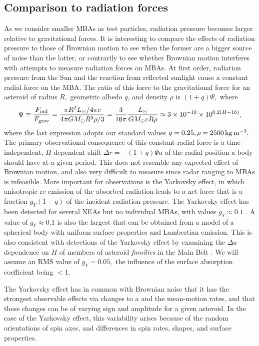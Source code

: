 \documentclass[linenumbers, onecolumn]{aastex631}
\newcommand{\eg}{\textit{e.g.\/}}
\newcommand\edited[1]{{\color{blue} {#1}}}
\begin{document}
\subsection{Comparison to radiation forces}
As we consider smaller MBAs as test particles, radiation pressure becomes larger relative to gravitational forces.  It is interesting to compare the effects of radiation pressure to those of Brownian motion to see when the former are a bigger source of noise than the latter, or contrarily to see whether Brownian motion interferes with attempts to measure radiation forces on MBAs.  At first order, radiation pressure from the Sun and the reaction from reflected sunlight cause a constant radial force on the MBA.  The ratio of this force to the gravitational force for an asteroid of radius $R,$ geometric albedo $q$, and density $\rho$ is $(1+q)\Psi,$ where
\begin{equation}
 \Psi \equiv \frac{F_{\rm rad}}{F_{\rm grav}} = \frac{\pi R^2 L_\odot/4\pi c}{4\pi GM_\odot R^3\rho/3}
   = \frac{3}{16\pi} \frac{L_\odot}{GM_\odot c R \rho} \approx
   3\times10^{-10} \times 10^{0.2(H-16)},
\end{equation}
where the last expression adopts our standard values $q=0.25,
\rho=2500\,{\rm kg}\, {\rm m}^{-3}.$ The primary observational consequence of
this constant radial force is a time-independent, $H$-dependent 
shift $\Delta r = -(1+q)\Psi a$ of the radial position a body should
have at a given period.  
This does not resemble
any expected effect of Brownian motion, and also very difficult to
measure since radar ranging to MBAs is infeasible.  More important for
observations is the
Yarkovsky effect, in which anisotropic re-emission of the absorbed
radiation leads to a net force that is a fraction $g_Y(1-q)$ of the
incident radiation pressure.  The Yarkovsky effect has been detected
for several NEAs but no individual MBAs, with values $g_Y \approx 0.1$
\citep[Yarkovsky effect and data are review by][]{yarkovsky}.
\edited{A value of $g_Y\approx0.1$ is also the largest that can be obtained
  from a model of a spherical body with uniform surface properties and
  Lambertian emission.} This is also consistent with detections of the
Yarkovsky effect by examining the $\Delta a$ dependence on $H$ of
members of asteroid \emph{families} in the Main Belt
\citep[\eg][]{karin}.  \edited{We will assume an RMS value of $g_Y=0.05,$
the influence of the surface absorption coefficient being $<1.$}

 The Yarkovsky effect has in common with Brownian noise that it has the strongest observable effects via changes to $a$ and the mean-motion rates, and that these changes can be of varying sign and amplitude for a given asteroid.  In the case of the Yarkovsky effect, this variability arises because of the random orientations of spin axes, and differences in spin rates, shapes, and surface properties.  
 
\end{document}
